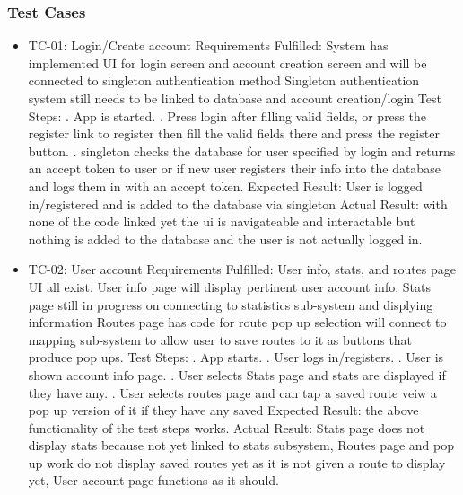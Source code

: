 ﻿\documentclass{article}
\begin{document}
\subsubsection{Test Cases}
\begin{itemize}
\item TC-01: Login/Create account
\subitem Requirements Fulfilled:
\subsubitem System has implemented UI for login screen and account creation screen and will be connected to singleton authentication method
\subsubitem Singleton authentication system still needs to be linked to database and account creation/login
\subitem Test Steps:
. App is started.
. Press login after filling valid fields, or press the register link to register then fill the valid fields there and press the register button.
. singleton checks the database for user specified by login and returns an accept token to user or if new user registers their info into the database and logs them in with an accept token.
\subitem Expected Result: User is logged in/registered and is added to the database via singleton
\subitem Actual Result: with none of the code linked yet the ui is navigateable and interactable but nothing is added to the database and the user is not actually logged in.
\item TC-02: User account
\subitem Requirements Fulfilled:
\subsubitem User info, stats, and routes page UI all exist.
\subsubitem User info page will display pertinent user account info.
\subsubitem Stats page still in progress on connecting to statistics sub-system and displying information
\subsubitem Routes page has code for route pop up selection will connect to mapping sub-system to allow user to save routes to it as buttons that produce pop ups.
\subitem Test Steps:
. App starts.
. User logs in/registers.
. User is shown account info page.
. User selects Stats page and stats are displayed if they have any.
. User selects routes page and can tap a saved route veiw a pop up version of it if they have any saved
\subitem Expected Result: the above functionality of the test steps works.
\subitem Actual Result: Stats page does not display stats because not yet linked to stats subsystem, Routes page and pop up work do not display saved routes yet as it is not given a route to display yet, User account page functions as it should.
\end{itemize}
\end{document}
